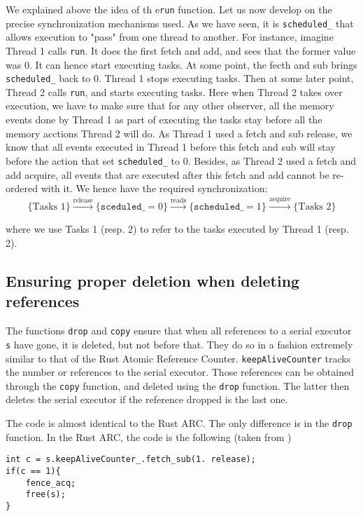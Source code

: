 We explained above the idea of th e\texttt{run} function. Let us now develop on the precise synchronization mechanisms used. As we have seen, it is \texttt{scheduled\_} that allows execution to "pass" from one thread to another. For instance, imagine Thread 1 calls \texttt{run}. It does the first fetch and add, and sees that the former value was 0. It can hence start executing tasks. At some point, the fecth and sub brings \texttt{scheduled\_} back to 0. Thread 1 stops executing tasks. Then at some later point, Thread 2 calls \texttt{run}, and starts executing tasks. Here when Thread 2 takes over execution, we have to make sure that for any other observer, all the memory events done by Thread 1 as part of executing the tasks stay before all the memory acctions Thread 2 will do. As Thread 1 used a fetch and sub release, we know that all events executed in Thread 1 before this fetch and sub will stay before the action that set \texttt{scheduled\_} to 0. Besides, as Thread 2 used a fetch and add acquire, all events that are executed after this fetch and add cannot be re-ordered with it. We hence have the required synchronization:
\[
				\{\text{Tasks 1}\} 
				\xrightarrow{\text{release}} 
				\{\mathtt{sceduled\_} = 0\} 
				\xrightarrow{\text{reads}} 
				\{\mathtt{scheduled\_} = 1\} 
				\xrightarrow{\text{acquire}} 
				\{\text{Tasks 2}\}
		\]

where we use Tasks 1 (resp. 2) to refer to the tasks executed by Thread 1 (resp. 2).

\subsection{Ensuring proper deletion when deleting references}
The functions \texttt{drop} and \texttt{copy} ensure that when all references to a serial executor \texttt{s} have gone, it is deleted, but not before that. They do so in a fashion extremely similar to that of the Rust Atomic Reference Counter. \texttt{keepAliveCounter} tracks the number or references to the serial executor. Those references can be obtained through the \texttt{copy} function, and deleted using the \texttt{drop} function. The latter then deletes the serial executor if the reference dropped is the last one. 

The code is almost identical to the Rust ARC. The only difference is in the \texttt{drop} function. In the Rust ARC, the code is the following (taken from \cite{fsl})

\begin{lstlisting}
int c = s.keepAliveCounter_.fetch_sub(1. release);
if(c == 1){
	fence_acq;
	free(s);
}
\end{lstlisting}

